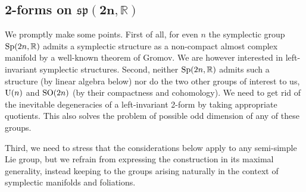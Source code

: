 \documentclass[10pt,a4paper]{amsart}
\numberwithin{equation}{section}
\begin{document}
\subsection[2-forms on $\mathfrak{sp}(2n,\mathbb{R})$]{2-forms on $\boldsymbol{\mathfrak{sp}(2n,\mathbb{R})}$}

We promptly make some points. First of all, for even $n$ the symplectic group ${\rm Sp}(2n,\mathbb{R})$ admits a symplectic structure as a non-compact almost complex manifold by a well-known theorem of Gromov. We are however interested in left-invariant symplectic structures. Second, neither ${\rm Sp}(2n,\mathbb{R})$ admits such a structure (by linear algebra below) nor do the two other groups of interest to us, ${\rm U}(n)$ and ${\rm SO}(2n)$ (by their compactness and cohomology). We need to get rid of the inevitable degeneracies of a left-invariant 2-form by taking appropriate quotients. This also solves the problem of possible odd dimension of any of these groups.

Third, we need to stress that the considerations below apply to any semi-simple Lie group, but we refrain from expressing the construction in its maximal generality, instead keeping to the groups arising naturally in the context of symplectic manifolds and foliations.
\end{document}

